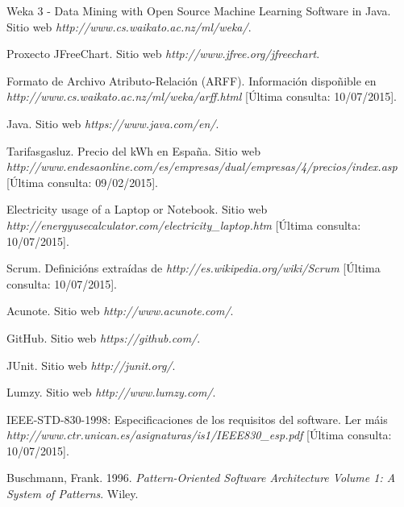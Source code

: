 

\begin{thebibliography}{99}

 Weka 3 - Data Mining with Open Source Machine Learning Software in Java. Sitio web {\it http://www.cs.waikato.ac.nz/ml/weka/}.

 Proxecto JFreeChart. Sitio web {\it http://www.jfree.org/jfreechart}.

 Formato de Archivo Atributo-Relación (ARFF). Información dispoñible en {\it http://www.cs.waikato.ac.nz/ml/weka/arff.html} [Última consulta: 10/07/2015].

 Java. Sitio web {\it https://www.java.com/en/}.

 Tarifasgasluz. Precio del kWh en España. Sitio web {\it http://www.endesaonline.com/es/empresas/dual/empresas/4/precios/index.asp} [Última consulta: 09/02/2015].

 Electricity usage of a Laptop or Notebook. Sitio web {\it http://energyusecalculator.com/electricity\_laptop.htm} [Última consulta: 10/07/2015].

 Scrum. Definicións extraídas de {\it http://es.wikipedia.org/wiki/Scrum} [Última consulta: 10/07/2015].

 Acunote. Sitio web {\it http://www.acunote.com/}.

 GitHub. Sitio web {\it https://github.com/}.

 JUnit. Sitio web {\it http://junit.org/}.

 Lumzy. Sitio web {\it http://www.lumzy.com/}.

 IEEE-STD-830-1998: Especificaciones de los requisitos del software. Ler máis {\it http://www.ctr.unican.es/asignaturas/is1/IEEE830\_esp.pdf} [Última consulta: 10/07/2015].

 Buschmann, Frank. 1996. \textit{Pattern-Oriented Software Architecture Volume 1: A System of Patterns}. Wiley. 

\end{thebibliography}

